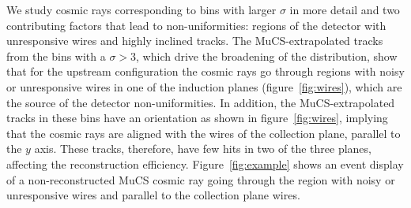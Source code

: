 \documentclass[a4paper,11pt]{article}
\begin{document}
%

We study cosmic rays corresponding to bins with larger $\sigma$ in more detail and two contributing factors that lead to non-uniformities: regions of the detector with unresponsive wires and highly inclined tracks. The MuCS-extrapolated tracks from the bins with a $\sigma>3$, which drive the broadening of the distribution, show that for the upstream configuration the cosmic rays go through regions with noisy or unresponsive wires in one of the induction planes (figure~\ref{fig:wires}), which are the source of the detector non-uniformities.
In addition, the MuCS-extrapolated tracks in these bins have an orientation as shown in figure~\ref{fig:wires}, implying that the cosmic rays are aligned with the wires of the collection plane, parallel to the $y$ axis.  These tracks, therefore, have few hits in two of the three planes, affecting the reconstruction efficiency. Figure~\ref{fig:example} shows an event display of a non-reconstructed MuCS cosmic ray going through the region with noisy or unresponsive wires and parallel to the collection plane wires.
\end{document}

